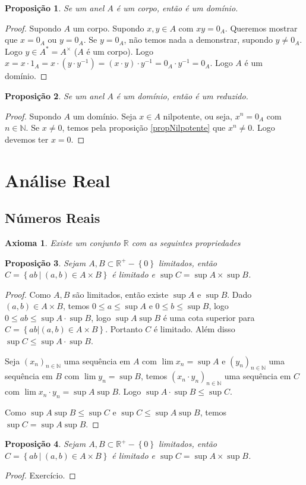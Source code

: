 \documentclass{article}
\theoremstyle{plain}
\newtheorem{axioma}{Axioma}
\newtheorem{prop}{Proposição}[section]
\theoremstyle{definition}
\theoremstyle{remark}
\begin{document}
\begin{prop}
	Se um anel $A$ é um corpo, então é um domínio.
\end{prop}
\begin{proof}
	Supondo $A$ um corpo. Supondo $x,y\in A$ com $xy = 0_A$. Queremos mostrar que $x =0_A$ ou $y = 0_A$. Se $y = 0_A$, não temos nada a demonstrar, supondo $y\neq 0_A$. Logo $y \in A^{*} = A^{\times}$ ($A$ é um corpo). Logo $x =x\cdot 1_A =  x\cdot (y\cdot y^{-1}) = (x\cdot y)\cdot y^{-1} = 0_A\cdot y^{-1} = 0_A$. Logo $A$ é um domínio.
\end{proof}
\begin{prop}
	Se um anel $A$ é um domínio, então é um reduzido.
\end{prop}
\begin{proof}
	Supondo $A$ um domínio. Seja $x\in A$ nilpotente, ou seja, $x^n = 0_A$ com $n\in \mathbb{N}$. Se $x\neq 0$, temos pela proposição \ref{propNilpotente} que $x^n \neq 0$.  Logo devemos ter $x = 0$.
\end{proof}
\section{Análise Real}
\subsection{Números Reais}

\begin{axioma}
	Existe um conjunto $\mathbb{R}$ com as seguintes propriedades
\end{axioma}
\begin{prop}
	Sejam $A,B\subset \mathbb{R}^{+}-\left\{0\right\}$ limitados, então $C = \left\{ ab \: | \: (a,b) \in A\times B \right\}$ é limitado e $\sup C = \sup A \times \sup B$.
\end{prop}
\begin{proof}
	Como $A,B$ são limitados, então existe $\sup A$ e $\sup B$.
	Dado $(a,b) \in A\times B$, temos $ 0 \leq a \leq \sup A $ e $0\leq b \leq \sup B$, logo $0\leq ab \leq \sup A\cdot \sup B$, logo $\sup A \sup B$ é uma cota superior para $ C = \left\{ ab | (a,b) \in A\times B \right\}$. Portanto $C$ é limitado.  Além disso $\sup C  \leq \sup A \cdot \sup B$.


	Seja $(x_n)_{n\in \mathbb{N}}$ uma sequência em $A$ com $\lim x_n = \sup A$ e $(y_n)_{n\in \mathbb{N}}$ uma sequência em $B$ com $\lim y_n = \sup B$, temos $(x_n\cdot y_n)_{n \in \mathbb{N}}$ uma sequência em $C$ com $\lim x_n \cdot y_n = \sup A \sup B$. Logo $\sup A \cdot \sup B  \leq \sup C$.


	Como $\sup A \sup B \leq \sup C$ e $\sup C \leq \sup A \sup B$, temos $\sup C = \sup A \sup B$.

\end{proof}
\begin{prop}
	Sejam $A,B\subset \mathbb{R}^{+}-\left\{0\right\}$ limitados, então $C = \left\{ ab \: | \: (a,b) \in A\times B \right\}$ é limitado e $\sup C = \sup A \times \sup B$.
\end{prop}
\begin{proof}
	Exercício. %
\end{proof}
\end{document}

